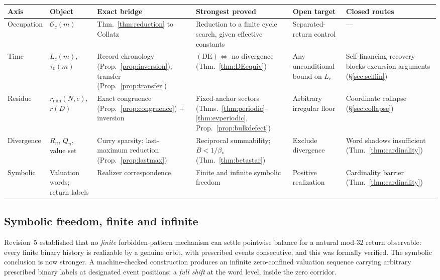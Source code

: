 \documentclass[11pt]{article}
\theoremstyle{plain}
\theoremstyle{definition}
\theoremstyle{remark}
\newcommand{\Occ}{\mathcal{O}}
\newcommand{\rmin}{r_{\min}}
\begin{document}
\begin{center}
\scriptsize
\begin{tabular}{@{}p{}p{}p{}p{}p{}p{}@{}}
\toprule
Axis & Object & Exact bridge & Strongest proved & Open target & Closed routes \\
\midrule
Occupation & $\Occ_c(m)$ & Thm.~\ref{thm:reduction} to Collatz & Reduction to a finite cycle
search, given effective constants & Separated-return control & --- \\
Time & $L_c(m)$, $\tau_0(m)$ & Record chronology (Prop.~\ref{prop:inversion}); transfer
(Prop.~\ref{prop:transfer}) & $(\mathrm{DE})\iff$ no divergence (Thm.~\ref{thm:DEequiv}) &
Any unconditional bound on $L_c$ & Self-financing recovery blocks excursion arguments
(\S\ref{sec:selffin}) \\
Residue & $\rmin(N,c)$, $r(D)$ & Exact congruence (Prop.~\ref{prop:congruence}) + inversion &
Fixed-anchor sectors (Thms.~\ref{thm:periodic}--\ref{thm:evperiodic},
Prop.~\ref{prop:bulkdefect}) & Arbitrary irregular floor & Coordinate collapse
(\S\ref{sec:collapse}) \\
Divergence & $R_n$, $Q_n$, value set & Curry sparsity; last-maximum reduction
(Prop.~\ref{prop:lastmax}) & Reciprocal summability; $B<1/\beta_*$ (Thm.~\ref{thm:betastar}) &
Exclude divergence & Word shadows insufficient (Thm.~\ref{thm:cardinality}) \\
Symbolic & Valuation words; return labels & Realizer correspondence & Finite and infinite symbolic
freedom & Positive realization & Cardinality barrier (Thm.~\ref{thm:cardinality}) \\
\bottomrule
\end{tabular}
\end{center}

\subsection{Symbolic freedom, finite and infinite}\label{sec:symbolic}

Revision~5 established that no \emph{finite} forbidden-pattern mechanism can settle pointwise
balance for a natural mod-$32$ return observable: every finite binary history is realizable by a
genuine orbit, with prescribed events consecutive, and this was formally verified. The symbolic
conclusion is now stronger. A machine-checked construction produces an infinite zero-confined
valuation sequence carrying arbitrary prescribed binary labels at designated event positions: a
\emph{full shift} at the word level, inside the zero corridor.
\end{document}
